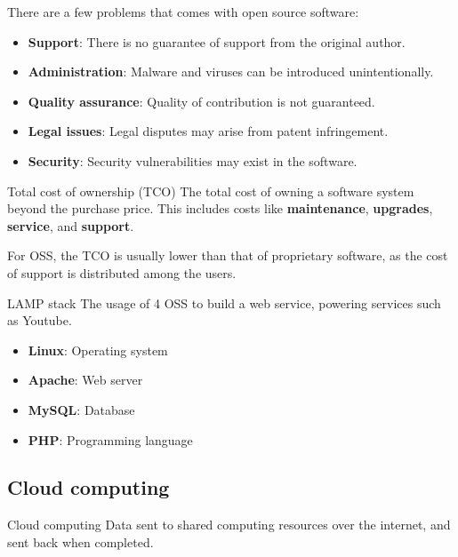 \documentclass{article}
\begin{document}
There are a few problems that comes with open source software:

\begin{itemize}
    \item \textbf{Support}: There is no guarantee of support from the original author.
    \item \textbf{Administration}: Malware and viruses can be introduced unintentionally.
    \item \textbf{Quality assurance}: Quality of contribution is not guaranteed.
    \item \textbf{Legal issues}: Legal disputes may arise from patent infringement.
    \item \textbf{Security}: Security vulnerabilities may exist in the software.
\end{itemize}

\begin{definition}
    {Total cost of ownership (TCO)}
    The total cost of owning a software system beyond the purchase price. This includes costs like \textbf{maintenance}, \textbf{upgrades}, \textbf{service}, and \textbf{support}.

    For OSS, the TCO is usually lower than that of proprietary software, as the cost of support is distributed among the users.
\end{definition}

\begin{definition}
    {LAMP stack}
    The usage of 4 OSS to build a web service, powering services such as Youtube.
    \begin{itemize}
        \item \textbf{Linux}: Operating system
        \item \textbf{Apache}: Web server
        \item \textbf{MySQL}: Database
        \item \textbf{PHP}: Programming language
    \end{itemize}
\end{definition}

\subsection{Cloud computing}

\begin{definition}
    {Cloud computing}
    Data sent to shared computing resources over the internet, and sent back when completed.
\end{definition}
\end{document}
